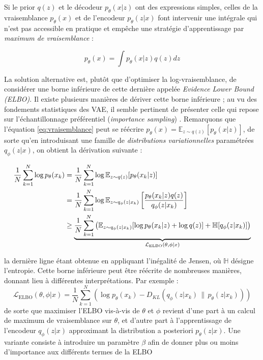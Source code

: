 \documentclass{article}
\begin{document}
        Si le prior $q(z)$ et le décodeur $p_\theta(x|z)$ ont des expressions simples, celles de la vraisemblance $p_\theta(x)$ et de l'encodeur $p_\theta(z|x)$ font intervenir une intégrale qui n'est pas accessible en pratique et empêche une stratégie d'apprentissage par \textit{maximum de vraisemblance} :

        \begin{equation}
            \label{eq:vraisemblance}
            p_\theta(x) = \int p_\theta(x | z) q(z) dz 
        \end{equation}

        La solution alternative est, plutôt que d'optimiser la log-vraisemblance, de considérer une borne inférieure de cette dernière appelée \textit{Evidence Lower Bound (ELBO)}. Il existe plusieurs manières de dériver cette borne inférieure ; au vu des fondements statistiques des VAE, il semble pertinent de présenter celle qui repose sur l'échantillonnage préférentiel (\textit{importance sampling}) \cite{burdaImportanceWeightedAutoencoders2016}. Remarquons que l'équation \ref{eq:vraisemblance} peut se réécrire $p_\theta(x) = \mathbb E_{z \sim q(z)}[p_\theta(x|z)]$, de sorte qu'en introduisant une famille de \textit{distributions variationnelles} paramétrées $q_\phi(z|x)$, on obtient la dérivation suivante :

        \begin{align}
            \frac{1}{N}\sum_{k = 1}^N\log p_\theta(x_k) &= \frac{1}{N}\sum_{k = 1}^N \log \mathbb E_{z \sim q(z)}[p_\theta(x_k|z)] \notag \\
                            &=\frac{1}{N}\sum_{k = 1}^N \log \mathbb E_{z \sim q_\phi(z|x_k)}\left[\frac{p_\theta(x_k|z)q(z)}{q_\phi(z|x_k)}\right] \notag \\
                            &\ge \underbrace{\frac{1}{N}\sum_{k = 1}^N\left( \mathbb{E}_{z \sim q_\phi(z|x_k)}[\log p_\theta(x_k|z) + \log q(z)] + \mathbb H [q_\phi(z|x_k)]\right)}_{\mathcal L_{\mathrm{ELBO}}(\theta, \phi|x)}
            \label{eq:elbo_derivation}
        \end{align}
   
   
        la dernière ligne étant obtenue en appliquant l'inégalité de Jensen, où $\mathbb H$ désigne l'entropie. Cette borne inférieure peut être réécrite de nombreuses manières, donnant lieu à différentes interprétations. Par exemple :
        \begin{equation}
            \label{eq:ELBO}
            \mathcal L_{\mathrm{ELBO}}(\theta, \phi | x) =\frac{1}{N}\sum_{k = 1}^N \left( \log p_\theta(x_k) - D_{KL}(q_\phi(z|x_k)\,\|\,p_\theta(z|x_k))\right)
        \end{equation}
        de sorte que maximiser l'ELBO vis-à-vis de $\theta$ et $\phi$ revient d'une part à un calcul de maximum de vraisemblance sur $\theta$, et d'autre part à l'apprentissage de l'encodeur $q_\phi(z | x)$ approximant la distribution a posteriori $p_\theta(z | x)$. Une variante consiste à introduire un paramètre $\beta$ afin de donner plus ou moins d'importance aux différents termes de la ELBO \cite{conf/iclr/HigginsMPBGBML17}
\end{document}
